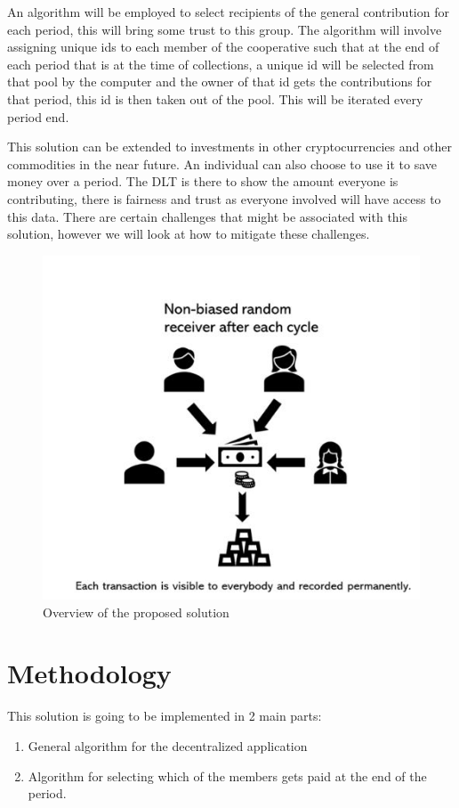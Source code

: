 \documentclass{article}
\begin{document}
An algorithm will be employed to select recipients of the general contribution for each period, this will bring some trust to this group. The algorithm will involve assigning unique ids to each member of the cooperative such that at the end of each period that is at the time of collections, a unique id will be selected from that pool by the computer and the owner of that id gets the contributions for that period, this id is then taken out of the pool. This will be iterated every period end.

This solution can be extended to investments in other cryptocurrencies and other commodities in the near future. An individual can also choose to use it to save money over a period. The DLT is there to show the amount everyone is contributing, there is fairness and trust as everyone involved will have access to this data. There are certain challenges that might be associated with this solution, however we will look at how to mitigate these challenges.

\begin{figure}[h!]
\centering
\includegraphics[scale=1.0]{cop}
\caption{Overview of the proposed solution}
\label{fig:central}
\end{figure}



\section{Methodology}
This solution is going to be implemented in 2 main parts:
\begin{enumerate}
    \item General algorithm for the decentralized application
    \item Algorithm for selecting which of the members gets paid at the end of the period.
\end{enumerate}
\end{document}
